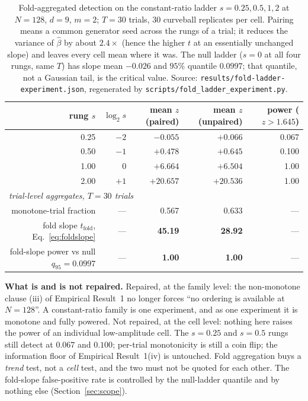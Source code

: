 \documentclass[11pt,a4paper]{article}
\theoremstyle{plain}
\theoremstyle{remark}
\theoremstyle{plain}
\begin{document}
\begin{table}[h]
\centering
\small
\begin{tabular}{rrrrr}
\toprule
rung $s$ & $\log_2 s$ & mean $z$ (paired) & mean $z$ (unpaired) & power ($z>1.645$) \\
\midrule
0.25 & $-2$ & $-0.055$ & $+0.066$ & 0.067 \\
0.50 & $-1$ & $+0.478$ & $+0.645$ & 0.100 \\
1.00 & $0$  & $+6.664$ & $+6.504$ & 1.00 \\
2.00 & $+1$ & $+20.657$ & $+20.536$ & 1.00 \\
\midrule
\multicolumn{5}{l}{\emph{trial-level aggregates, $T=30$ trials}}\\
monotone-trial fraction & --- & 0.567 & 0.633 & --- \\
fold slope $t_{\mathrm{fold}}$, Eq.~\eqref{eq:foldslope} & --- & \textbf{45.19} & \textbf{28.92} & --- \\
fold-slope power vs null $q_{95}=0.0997$ & --- & \textbf{1.00} & \textbf{1.00} & --- \\
\bottomrule
\end{tabular}
\caption{Fold-aggregated detection on the constant-ratio ladder $s=0.25,0.5,1,2$ at $N=128$, $d=9$, $m=2$; $T=30$ trials, $30$ curveball replicates per cell. Pairing means a common generator seed across the rungs of a trial; it reduces the variance of $\hat\beta$ by about $2.4\times$ (hence the higher $t$ at an essentially unchanged slope) and leaves every cell mean where it was. The null ladder ($s=0$ at all four rungs, same $T$) has slope mean $-0.026$ and $95\%$ quantile $0.0997$; that quantile, not a Gaussian tail, is the critical value. Source: \texttt{results/fold-ladder-experiment.json}, regenerated by \texttt{scripts/fold\_ladder\_experiment.py}.}
\label{tab:fold}
\end{table}

\textbf{What is and is not repaired.} Repaired, at the family level: the non-monotone clause (iii) of Empirical Result~1 no longer forces ``no ordering is available at $N=128$''. A constant-ratio family is one experiment, and as one experiment it is monotone and fully powered. Not repaired, at the cell level: nothing here raises the power of an individual low-amplitude cell. The $s=0.25$ and $s=0.5$ rungs still detect at $0.067$ and $0.100$; per-trial monotonicity is still a coin flip; the information floor of Empirical Result~1(iv) is untouched. Fold aggregation buys a \emph{trend} test, not a \emph{cell} test, and the two must not be quoted for each other. The fold-slope false-positive rate is controlled by the null-ladder quantile and by nothing else (Section~\ref{sec:scope}).
\end{document}
